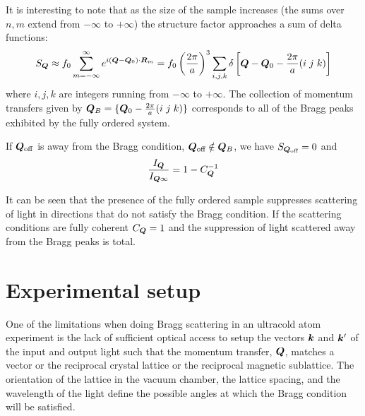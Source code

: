 It is interesting to note that as the size of the sample increases (the sums over $n,m$ extend from $-\infty$ to $+\infty$)  the structure factor approaches a sum of delta functions:
\begin{equation}   
 S_{\bm{Q}} \approx f_{0}  \sum_{m=-\infty}^{\infty}
e^{i(\bm{Q}-\bm{Q}_{0})\cdot \bm{R}_{m}} =  
 f_{0}\left(\frac{2\pi}{a}\right)^{3} \sum_{i,j,k} \delta\left[ \bm{Q}-\bm{Q}_{0} - \frac{2\pi}{a}(i\hspace{0.3em}j\hspace{0.3em}k) \right]
\end{equation}
where $i,j,k$ are integers running from $-\infty$ to $+\infty$.  The collection
of momentum transfers given by $\bm{Q}_{B} = \lbrace \bm{Q}_{0} -
\frac{2\pi}{a}(i\hspace{0.3em}j\hspace{0.3em}k) \rbrace$ corresponds to all of the Bragg peaks exhibited by
the fully ordered system.

If $\bm{Q}_{\text{off}}$ is away from the Bragg condition, $\bm{Q}_{\text{off}}
\notin \bm{Q}_{B}$, we have $ S_{\bm{Q}_{\text{off}}} = 0 $ and 
\begin{equation}
  \frac{ I_{\bm{Q}} }{ I_{\bm{Q}\infty}} = 
  1 - C_{\bm{Q}}^{-1} 
\end{equation}

It can be seen that the presence of the fully ordered sample suppresses
scattering of light in directions that do not satisfy the Bragg condition.  If
the scattering conditions are fully coherent $C_{\bm{Q}} = 1 $ and the
suppression of light scattered away from the Bragg peaks is total.  


\section{Experimental setup} 

One of the limitations when doing Bragg scattering in an ultracold atom
experiment is the lack of sufficient optical access to setup the vectors
$\bm{k}$ and $\bm{k}'$ of the input and output light such that the momentum
transfer, $\bm{Q}$, matches a vector or the reciprocal crystal lattice or the
reciprocal magnetic sublattice.  The orientation of the lattice in the vacuum
chamber, the lattice spacing, and the wavelength of the light define the
possible angles at which the Bragg condition will be satisfied. 

